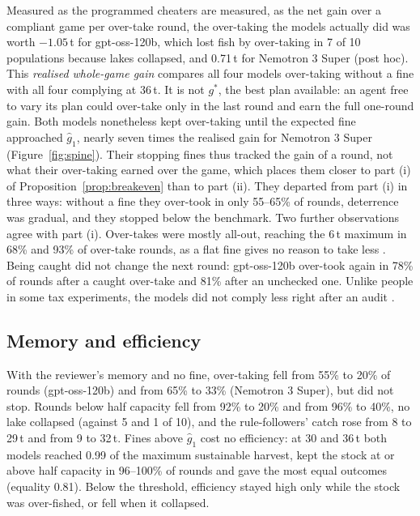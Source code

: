 \documentclass[letterpaper]{article} %
\newcommand{\gstar}{g^{*}}
\begin{document}
Measured as the programmed cheaters are measured, as the net gain over a compliant game per over-take round, the over-taking the models actually did was worth $-1.05$\,t for gpt-oss-120b, which lost fish by over-taking in 7 of 10 populations because lakes collapsed, and 0.71\,t for Nemotron 3 Super (post hoc). This \emph{realised whole-game gain} compares all four models over-taking without a fine with all four complying at 36\,t. It is not $\gstar$, the best plan available: an agent free to vary its plan could over-take only in the last round and earn the full one-round gain. Both models nonetheless kept over-taking until the expected fine approached $\hat g_1$, nearly seven times the realised gain for Nemotron 3 Super (Figure~\ref{fig:spine}). Their stopping fines thus tracked the gain of a round, not what their over-taking earned over the game, which places them closer to part (i) of Proposition~\ref{prop:breakeven} than to part (ii). They departed from part (i) in three ways: without a fine they over-took in only 55--65\% of rounds, deterrence was gradual, and they stopped below the benchmark. Two further observations agree with part (i). Over-takes were mostly all-out, reaching the 6\,t maximum in 68\% and 93\% of over-take rounds, as a flat fine gives no reason to take less \citep{stigler1970optimum}. Being caught did not change the next round: gpt-oss-120b over-took again in 78\% of rounds after a caught over-take and 81\% after an unchecked one. Unlike people in some tax experiments, the models did not comply less right after an audit \citep{mittone2006dynamic,kastlunger2009sequences}.

\subsection{Memory and efficiency}

With the reviewer's memory and no fine, over-taking fell from 55\% to 20\% of rounds (gpt-oss-120b) and from 65\% to 33\% (Nemotron 3 Super), but did not stop. Rounds below half capacity fell from 92\% to 20\% and from 96\% to 40\%, no lake collapsed (against 5 and 1 of 10), and the rule-followers' catch rose from 8 to 29\,t and from 9 to 32\,t. Fines above $\hat g_1$ cost no efficiency: at 30 and 36\,t both models reached 0.99 of the maximum sustainable harvest, kept the stock at or above half capacity in 96--100\% of rounds and gave the most equal outcomes (equality 0.81). Below the threshold, efficiency stayed high only while the stock was over-fished, or fell when it collapsed.
\end{document}
